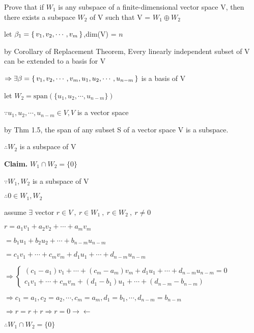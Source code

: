 Prove that if $W_1$ is any subspace of a finite-dimensional vector space V, then there exists a subspace $W_2$ of V such that V = $W_1 \oplus W_2$

\begin{tcolorbox}
	\begin{solution}
		let $\beta_1 = \left\{ \,v_1,v_2,\cdots,v_m \,\right\}$,dim(V) = $n$
		
		by Corollary of Replacement Theorem, Every linearly independent subset of V can be extended to a basis for V
		
		$\Rightarrow \exists \beta = \left\{ \,v_1,v_2,\cdots,v_m,u_1,u_2,\cdots,u_{n-m} \,\right\}$ is a basis of V
		
		let $W_2 = \text{span$(\{u_1,u_2,\cdots,u_{n-m}\})$}$
		
		$\because u_1,u_2,\cdots,u_{n-m} \in V,V$ is a vector space 
		
		by Thm 1.5, the span of any subset S of a vector space V is a subspace.
		
		$\therefore W_2$ is a subspace of V
		
		\textbf{Claim.} $W_1 \cap W_2 = \{0\}$
		
		$\because W_1,W_2$ is a subspace of V
		
		$\therefore 0 \in W_1 , W_2$
		
		assume $\exists$ vector $r \in V~,~ r \in W_1~,~ r \in W_2~,~ r \neq 0$
		
		$r = a_1v_1 + a_2v_2 + \cdots + a_mv_m$
		
		$=b_1u_1 + b_2u_2 + \cdots + b_{n-m}u_{n-m}$
		
		$=c_1v_1 + \cdots + c_mv_m + d_1u_1 + \cdots + d_{n-m}u_{n-m}$
		
		$\Rightarrow 
		\begin{cases}
			(c_1-a_1)v_1+\cdots+(c_m-a_m)v_m+d_1u_1+\cdots+d_{n-m}u_{n-m} = 0 \\
			c_1v_1 + \cdots + c_mv_m+(d_1-b_1)u_1 + \cdots + (d_{n-m}-b_{n-m})		
		\end{cases}$
		
		$\Rightarrow c_1 = a_1,c_2=a_2,\cdots,c_m=a_m,d_1=b_1,\cdots,d_{n-m} = b_{n-m}$
		
		$\Rightarrow r = r+r \Rightarrow r=0 \rightarrow\leftarrow$
		
		$\therefore W_1 \cap W_2 = \{0\}$		
	\end{solution}
\end{tcolorbox}